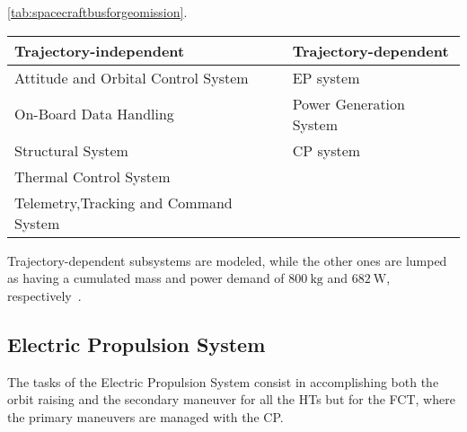 \tablename\ref{tab:spacecraftbusforgeomission}.
\begin{table*}[htp]
\centering
\caption{\textbf{Spacecraft Bus for HTs to GEO}}
\label{tab:spacecraftbusforgeomission}
\small
\begin{tabular}{*{2}{l}}
\toprule
\toprule
Trajectory-independent&Trajectory-dependent\\
\midrule
Attitude and Orbital Control System&EP system\\
On-Board Data Handling&Power Generation System\\
Structural System&CP system\\
Thermal Control System&\\
Telemetry,Tracking and Command System&\\
\bottomrule
\bottomrule
\end{tabular} 
\end{table*}
Trajectory-dependent subsystems are modeled, while the other ones are lumped as having a cumulated mass and power demand of $800~\si{\kilo\gram}$ and $682~\si{\watt}$, respectively~\cite{tesisimo}.
\subsection{Electric Propulsion System}
The tasks of the Electric Propulsion System consist in accomplishing both the orbit raising and the secondary maneuver for all the HTs but for the FCT, where the primary maneuvers are managed with the CP. 

